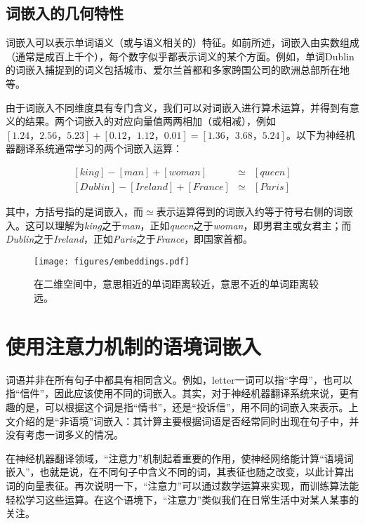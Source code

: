 \documentclass[output=paper,colorlinks,citecolor=brown]{langscibook}
\begin{document}
\subsection{词嵌入的几何特性}

词嵌入可以表示单词语义（或与语义相关的）特征。如前所述，词嵌入由实数组成（通常是成百上千个），每个数字似乎都表示词义的某个方面。例如，单词Dublin的词嵌入捕捉到的词义包括城市、爱尔兰首都和多家跨国公司的欧洲总部所在地等。

由于词嵌入不同维度具有专门含义，我们可以对词嵌入进行算术运算，并得到有意义的结果。两个词嵌入的对应向量值两两相加（或相减），例如$[1.24，2.56，5.23]+[0.12，1.12，0.01]=[1.36，3.68，5.24]$。以下为神经机器翻译系统通常学习的两个词嵌入运算：

\begin{eqnarray*}
\mathit{[king]}-\mathit{[man]}+\mathit{[woman]} &\simeq & \mathit{[queen]} \\
\mathit{[Dublin]}-\mathit{[Ireland]}+\mathit{[France]} & \simeq & \mathit{[Paris]}
\end{eqnarray*}

其中，方括号指的是词嵌入，而$\simeq$表示运算得到的词嵌入约等于符号右侧的词嵌入。这可以理解为\emph{king}之于\emph{man}，正如\emph{queen}之于\emph{woman}，即男君主或女君主；而\emph{Dublin}之于\emph{Ireland}，正如\emph{Paris}之于\emph{France}，即国家首都。

\begin{figure}[tb]
\texttt{[image: figures/embeddings.pdf]}
\caption{在二维空间中，意思相近的单词距离较近，意思不近的单词距离较远。}
\label{fg:2dwordembedding}
\end{figure}

\section{使用注意力机制的语境词嵌入} 

词语并非在所有句子中都具有相同含义。例如，letter一词可以指“字母”，也可以指“信件”，因此应该使用不同的词嵌入。其实，对于神经机器翻译系统来说，更有趣的是，可以根据这个词是指“情书”，还是“投诉信”，用不同的词嵌入来表示。上文介绍的是“非语境”词嵌入：其计算主要根据词语是否经常同时出现在句子中，并没有考虑一词多义的情况。

在神经机器翻译领域，“注意力”机制起着重要的作用，使神经网络能计算“语境词嵌入”，也就是说，在不同句子中含义不同的词，其表征也随之改变，以此计算出词的向量表征。再次说明一下，“注意力”可以通过数学运算来实现，而训练算法能轻松学习这些运算。在这个语境下，“注意力”类似我们在日常生活中对某人某事的关注。
\end{document}
